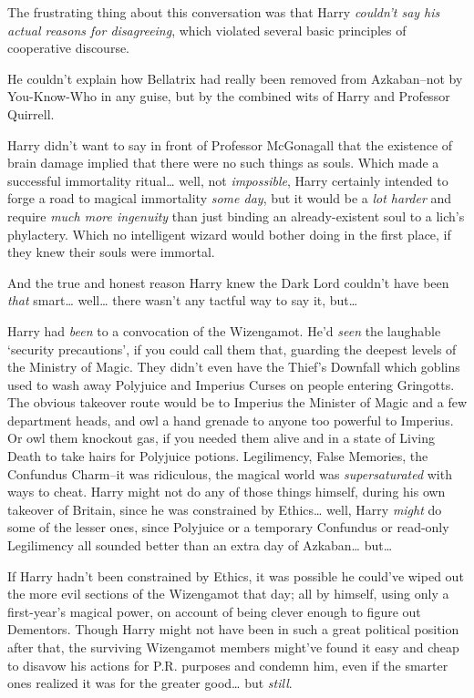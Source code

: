 \later

The frustrating thing about this conversation was that Harry \emph{couldn't say his actual reasons for disagreeing}, which violated several basic principles of cooperative discourse.

He couldn't explain how Bellatrix had really been removed from Azkaban\---not by You-Know-Who in any guise, but by the combined wits of Harry and Professor Quirrell.

Harry didn't want to say in front of Professor McGonagall that the existence of brain damage implied that there were no such things as souls. Which made a successful immortality ritual{\ldots} well, not \emph{impossible}, Harry certainly intended to forge a road to magical immortality \emph{some day}, but it would be a \emph{lot harder} and require \emph{much more ingenuity} than just binding an already-existent soul to a lich's phylactery. Which no intelligent wizard would bother doing in the first place, if they knew their souls were immortal.

And the true and honest reason Harry knew the Dark Lord couldn't have been \emph{that} smart{\ldots} well{\ldots} there wasn't any tactful way to say it, but{\ldots}

Harry had \emph{been} to a convocation of the Wizengamot. He'd \emph{seen} the laughable `security precautions', if you could call them that, guarding the deepest levels of the Ministry of Magic. They didn't even have the Thief's Downfall which goblins used to wash away Polyjuice and Imperius Curses on people entering Gringotts. The obvious takeover route would be to Imperius the Minister of Magic and a few department heads, and owl a hand grenade to anyone too powerful to Imperius. Or owl them knockout gas, if you needed them alive and in a state of Living Death to take hairs for Polyjuice potions. Legilimency, False Memories, the Confundus Charm\---it was ridiculous, the magical world was \emph{supersaturated} with ways to cheat. Harry might not do any of those things himself, during his own takeover of Britain, since he was constrained by Ethics{\ldots} well, Harry \emph{might} do some of the lesser ones, since Polyjuice or a temporary Confundus or read-only Legilimency all sounded better than an extra day of Azkaban{\ldots} but{\ldots}

If Harry hadn't been constrained by Ethics, it was possible he could've wiped out the more evil sections of the Wizengamot that day; all by himself, using only a first-year's magical power, on account of being clever enough to figure out Dementors. Though Harry might not have been in such a great political position after that, the surviving Wizengamot members might've found it easy and cheap to disavow his actions for P.R. purposes and condemn him, even if the smarter ones realized it was for the greater good{\ldots} but \emph{still}.

